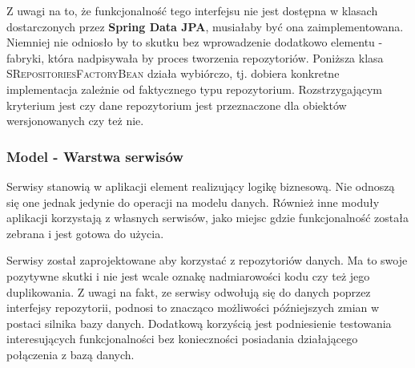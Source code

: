 			Z uwagi na to, że funkcjonalność tego interfejsu nie jest dostępna w klasach dostarczonych przez \textbf{Spring Data JPA},
			musiałaby być ona zaimplementowana. Niemniej nie odniosło by to skutku bez wprowadzenie dodatkowo elementu - fabryki, która
			nadpisywała by proces tworzenia repozytoriów. Poniższa klasa \textsc{SRepositoriesFactoryBean} działa wybiórczo, tj. dobiera
			konkretne implementacja zależnie od faktycznego typu repozytorium. Rozstrzygającym kryterium jest czy dane
			repozytorium jest przeznaczone dla obiektów wersjonowanych czy też nie. 
		\subsubsection{Model - Warstwa serwisów}
			Serwisy	stanowią w aplikacji element realizujący logikę biznesową. Nie odnoszą się one jednak jedynie do operacji
			na modelu danych. Również inne moduły aplikacji korzystają z własnych serwisów, jako miejsc gdzie funkcjonalność została
			zebrana i jest gotowa do użycia. 	
			
			Serwisy został zaprojektowane aby korzystać z repozytoriów danych. Ma to swoje pozytywne skutki
			i nie jest wcale oznakę nadmiarowości kodu czy też jego duplikowania. Z uwagi na fakt, ze serwisy
			odwołują się do danych poprzez interfejsy repozytorii, podnosi to znacząco możliwości 
			późniejszych zmian w postaci silnika bazy danych. Dodatkową korzyścią jest podniesienie testowania
			interesujących funkcjonalności bez konieczności posiadania działającego połączenia z bazą danych.
